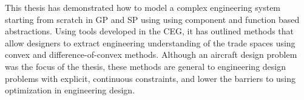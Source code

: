 This thesis has demonstrated how to model a complex engineering system
starting from scratch in \gls{GP} and \gls{SP} using
using component and function based abstractions. Using tools developed in the \gls{CEG},
it has outlined methods that allow designers to extract engineering understanding of
the trade spaces using convex and difference-of-convex methods.
Although an aircraft design problem was the focus of the thesis,
these methods are general to engineering design problems with explicit, continuous constraints,
and lower the barriers to using optimization in engineering design.


